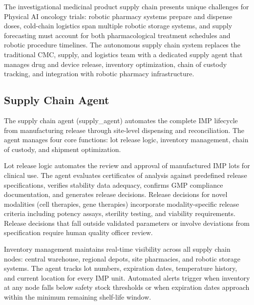
The investigational medicinal product supply chain presents unique challenges for Physical AI
oncology trials: robotic pharmacy systems prepare and dispense doses, cold-chain logistics
span multiple robotic storage systems, and supply forecasting must account for both
pharmacological treatment schedules and robotic procedure timelines. The autonomous supply
chain system replaces the traditional CMC, supply, and logistics team with a dedicated supply
agent that manages drug and device release, inventory optimization, chain of custody tracking,
and integration with robotic pharmacy infrastructure.

\subsection{Supply Chain Agent}

The supply chain agent (supply\_agent) automates the complete IMP lifecycle from manufacturing
release through site-level dispensing and reconciliation. The agent manages four core
functions: lot release logic, inventory management, chain of custody, and shipment
optimization.

Lot release logic automates the review and approval of manufactured IMP lots for clinical
use. The agent evaluates certificates of analysis against predefined release specifications,
verifies stability data adequacy, confirms GMP compliance documentation, and generates
release decisions. Release decisions for novel modalities (cell therapies, gene therapies)
incorporate modality-specific release criteria including potency assays, sterility testing,
and viability requirements. Release decisions that fall outside validated parameters or
involve deviations from specification require human quality officer review.

Inventory management maintains real-time visibility across all supply chain nodes: central
warehouse, regional depots, site pharmacies, and robotic storage systems. The agent tracks
lot numbers, expiration dates, temperature history, and current location for every IMP unit.
Automated alerts trigger when inventory at any node falls below safety stock thresholds
or when expiration dates approach within the minimum remaining shelf-life window.

